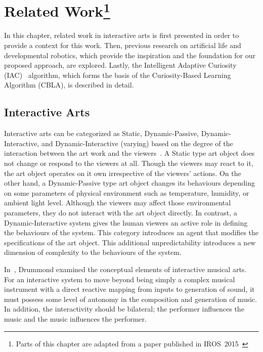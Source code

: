 \chapter[Related Work]{Related Work\footnote{Parts of this chapter are adapted from a paper published in IROS~2015~\cite{Chan2015}}} 
 \label{chap:related_work}

In this chapter, related work in interactive arts is first presented in order to provide a context for this work. Then, previous research on artificial life and developmental robotics, which provide the inspiration and the foundation for our proposed approach, are explored. Lastly, the Intelligent Adaptive Curiosity (IAC)~\cite{Oudeyer2007} algorithm, which forms the basis of the Curiosity-Based Learning Algorithm (CBLA), is described in detail.

\section{Interactive Arts}
Interactive arts can be categorized as Static, Dynamic-Passive, Dynamic-Interactive, and Dynamic-Interactive (varying) based on the degree of the interaction between the art work and the viewers~\cite{Edmonds2004}. A Static type art object does not change or respond to the viewers at all. Though the viewers may react to it, the art object operates on it own irrespective of the viewers' actions. On the other hand, a Dynamic-Passive type art object changes its behaviours depending on some parameters of physical environment such as temperature, humidity, or ambient light level. Although the viewers may affect those environmental parameters, they do not interact with the art object directly. In contrast, a Dynamic-Interactive system gives the human viewers an active role in defining the behaviours of the system. This category introduces an agent that modifies the specifications of the art object. This additional unpredictability introduces a new dimension of complexity to the behaviours of the system. 

In~\cite{Drummond2009}, Drummond examined the conceptual elements of interactive musical arts. For an interactive system to move beyond being simply a complex musical instrument with a direct reactive mapping from inputs to generation of sound, it must possess some level of autonomy in the composition and generation of music. In addition, the interactivity should be bilateral; the performer influences the music and the music influences the performer. 

